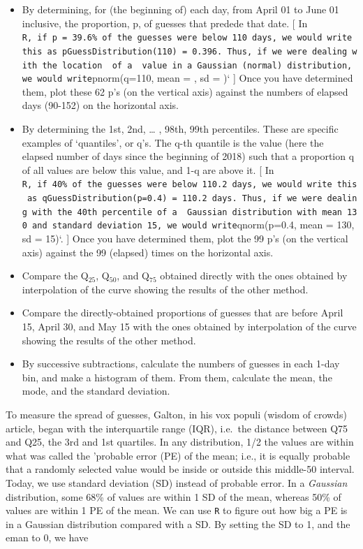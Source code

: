 \documentclass[]{book}
\begin{document}
\begin{itemize}
\item
  By determining, for (the beginning of) each day, from April 01 to June 01 inclusive, the proportion, p, of guesses that predede that date. {[} In \texttt{R\textquotesingle{},\ if\ p\ =\ 39.6\%\ of\ the\ guesses\ were\ below\ 110\ days,\ we\ would\ write\ this\ as\ pGuessDistribution(110)\ =\ 0.396.\ Thus,\ if\ we\ were\ dealing\ with\ the\ location\ \ of\ a\ \ value\ in\ a\ Gaussian\ (\textquotesingle{}normal\textquotesingle{})\ distribution,\ we\ would\ write}pnorm(q=110, mean = , sd = )` {]} Once you have determined them, plot these 62 p's (on the vertical axis) against the numbers of elapsed days (90-152) on the horizontal axis.
\item
  By determining the 1st, 2nd, \ldots{} , 98th, 99th percentiles. These are specific examples of `quantiles', or q's. The q-th quantile is the value (here the elapsed number of days since the beginning of 2018) such that a proportion q of all values are below this value, and 1-q are above it. {[} In \texttt{R\textquotesingle{},\ if\ 40\%\ of\ the\ guesses\ were\ below\ 110.2\ days,\ we\ would\ write\ this\ as\ qGuessDistribution(p=0.4)\ =\ 110.2\ days.\ Thus,\ if\ we\ were\ dealing\ with\ the\ 40th\ percentile\ of\ a\ \ Gaussian\ distribution\ with\ mean\ 130\ and\ standard\ deviation\ 15,\ we\ would\ write}qnorm(p=0.4, mean = 130, sd = 15)`. {]} Once you have determined them, plot the 99 p's (on the vertical axis) against the 99 (elapsed) times on the horizontal axis.
\item
  Compare the Q\(_{25}\), Q\(_{50}\), and Q\(_{75}\) obtained directly with the ones obtained by interpolation of the curve showing the results of the other method.
\item
  Compare the directly-obtained proportions of guesses that are before April 15, April 30, and May 15 with the ones obtained by interpolation of the curve showing the results of the other method.
\item
  By successive subtractions, calculate the numbers of guesses in each 1-day bin, and make a histogram of them. From them, calculate the mean, the mode, and the standard deviation.
\end{itemize}

To measure the spread of guesses, Galton, in his vox populi (wisdom of crowds) article, began with the interquartile range (IQR), i.e.~the distance between Q75 and Q25, the 3rd and 1st quartiles. In any distribution, 1/2 the values are within what was called the 'probable error (PE) of the mean; i.e., it is equally probable that a randomly selected value would be inside or outside this middle-50 interval. Today, we use standard deviation (SD) instead of probable error. In a \emph{Gaussian} distribution, some 68\% of values are within 1 SD of the mean, whereas 50\% of values are within 1 PE of the mean. We can use \texttt{R} to figure out how big a PE is in a Gaussian distribution compared with a SD. By setting the SD to 1, and the eman to 0, we have
\end{document}
